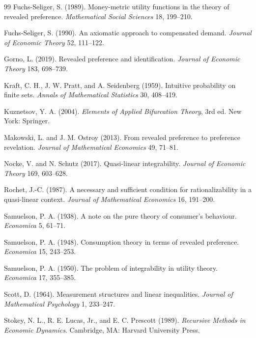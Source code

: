 \begin{thebibliography}{99}
Fuchs-Seliger, S. (1989).
Money-metric utility functions in the theory of revealed preference.
\emph{Mathematical Social Sciences} 18, 199--210.

Fuchs-Seliger, S. (1990).
An axiomatic approach to compensated demand.
\emph{Journal of Economic Theory} 52, 111--122.

Gorno, L. (2019).
Revealed preference and identification.
\emph{Journal of Economic Theory} 183, 698--739.

Kraft, C. H., J. W. Pratt, and A. Seidenberg (1959).
Intuitive probability on finite sets.
\emph{Annals of Mathematical Statistics} 30, 408--419.

Kuznetsov, Y. A. (2004).
\emph{Elements of Applied Bifurcation Theory}, 3rd ed.
New York: Springer.

Makowski, L. and J. M. Ostroy (2013).
From revealed preference to preference revelation.
\emph{Journal of Mathematical Economics} 49, 71--81.

Nocke, V. and N. Schutz (2017).
Quasi-linear integrability.
\emph{Journal of Economic Theory} 169, 603--628.

Rochet, J.-C. (1987).
A necessary and sufficient condition for rationalizability in a quasi-linear context.
\emph{Journal of Mathematical Economics} 16, 191--200.

Samuelson, P. A. (1938).
A note on the pure theory of consumer's behaviour.
\emph{Economica} 5, 61--71.

Samuelson, P. A. (1948).
Consumption theory in terms of revealed preference.
\emph{Economica} 15, 243--253.

Samuelson, P. A. (1950).
The problem of integrability in utility theory.
\emph{Economica} 17, 355--385.

Scott, D. (1964).
Measurement structures and linear inequalities.
\emph{Journal of Mathematical Psychology} 1, 233--247.

Stokey, N. L., R. E. Lucas, Jr., and E. C. Prescott (1989).
\emph{Recursive Methods in Economic Dynamics}.
Cambridge, MA: Harvard University Press.

\end{thebibliography}


